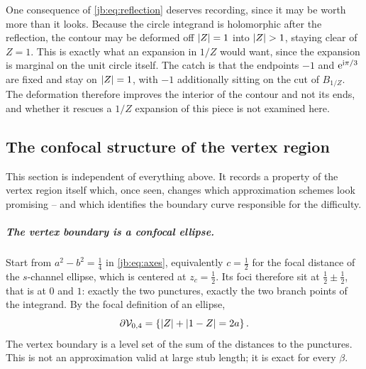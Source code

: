 One consequence of \eqref{jb:eq:reflection} deserves recording, since it may be worth more than it
looks.
Because the circle integrand is holomorphic after the reflection, the contour may be deformed off
${|Z|} = 1$ into ${|Z|} > 1$, staying clear of $Z = 1$.
This is exactly what an expansion in $1/Z$ would want, since the expansion is marginal on the unit
circle itself.
The catch is that the endpoints $-1$ and $\mathrm{e}^{\mathrm{i} \pi/3}$ are fixed and stay on ${|Z|} = 1$, with
$-1$ additionally sitting on the cut of $B_{1/Z}$.
The deformation therefore improves the interior of the contour and not its ends, and whether it
rescues a $1/Z$ expansion of this piece is not examined here.


\subsection{The confocal structure of the vertex region}
\label{jb:sec:confocal}


This section is independent of everything above.
It records a property of the vertex region itself which, once seen, changes which approximation
schemes look promising -- and which identifies the boundary curve responsible for the difficulty.

\subparagraph{The vertex boundary is a confocal ellipse.}
Start from $a^2 - b^2 = \tfrac14$ in \eqref{jb:eq:axes}, equivalently $c = \tfrac12$ for the focal
distance of the $s$-channel ellipse, which is centered at $z_c = \tfrac12$.
Its foci therefore sit at $\tfrac12 \pm \tfrac12$, that is at $0$ and $1$: exactly the two
punctures, exactly the two branch points of the integrand.
By the focal definition of an ellipse,
\begin{equation}
  \label{jb:eq:confocal}
  \partial {\mathcal{V}}_{0,4}
    = \left \{  {|Z|} + {|1 - Z|} = 2a  \right \} .
\end{equation}
The vertex boundary is a level set of the sum of the distances to the punctures.
This is not an approximation valid at large stub length; it is exact for every $\beta$.


